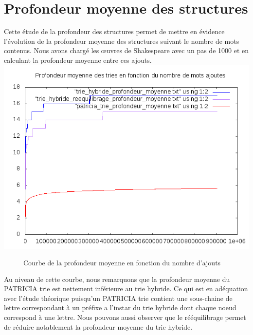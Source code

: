 \documentclass[a4paper,12pt]{report}
\begin{document}
\section{Profondeur moyenne des structures}
Cette étude de la profondeur des structures permet de mettre en évidence l'évolution de la profondeur moyenne des structures
suivant le nombre de mots contenus. Nous avons chargé les œuvres de Shakespeare avec un pas de 1000 et en calculant la profondeur
moyenne entre ces ajouts.\\
\includegraphics{../comparaison/courbe_profondeur_moyenne.png}
\begin{figure}[!htbp]
\caption{Courbe de la profondeur moyenne en fonction du nombre d'ajouts}
\end{figure}

Au niveau de cette courbe, nous remarquons que la profondeur moyenne du PATRICIA trie est nettement inférieure au trie hybride. Ce
qui est en adéquation avec l'étude théorique puisqu'un PATRICIA trie contient une sous-chaine de lettre correspondant à un
préfixe a l'instar du trie hybride dont chaque noeud correspond à une lettre.
Nous pouvons aussi observer que le rééquilibrage permet de réduire notablement la profondeur moyenne du trie hybride.
\end{document}
